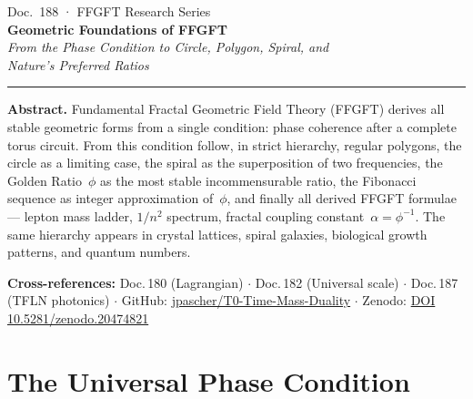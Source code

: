 
\thispagestyle{firstpage}
\begin{center}
  {\small\color{T0gray} Doc.~188 · FFGFT Research Series}\\[6pt]
  {\LARGE\bfseries\color{T0blue}
    Geometric Foundations of FFGFT}\\[6pt]
  {\large\itshape\color{T0gray}
    From the Phase Condition to Circle, Polygon, Spiral, and\\
    Nature's Preferred Ratios}\\[8pt]
  {\color{T0red}\rule{0.65\linewidth}{1.5pt}}
\end{center}
\vspace{4pt}

\begin{infobox}
\textbf{Abstract.}
Fundamental Fractal Geometric Field Theory (FFGFT) derives all
stable geometric forms from a single condition: phase coherence
after a complete torus circuit. From this condition follow, in
strict hierarchy, regular polygons, the circle as a limiting case,
the spiral as the superposition of two frequencies, the Golden
Ratio~$\phi$ as the most stable incommensurable ratio, the Fibonacci
sequence as integer approximation of~$\phi$, and finally all derived
FFGFT formulae — lepton mass ladder, $1/n^2$ spectrum, fractal
coupling constant~$\alpha = \phi^{-1}$. The same hierarchy appears
in crystal lattices, spiral galaxies, biological growth patterns,
and quantum numbers.

\smallskip\noindent\textbf{Cross-references:}
Doc.\,180 (Lagrangian) $\cdot$
Doc.\,182 (Universal scale) $\cdot$
Doc.\,187 (TFLN photonics) $\cdot$
GitHub: \href{https://github.com/jpascher/T0-Time-Mass-Duality}{jpascher/T0-Time-Mass-Duality} $\cdot$
Zenodo: \href{https://zenodo.org/records/20474821}{DOI 10.5281/zenodo.20474821}
\end{infobox}

\tableofcontents
\bigskip

\section{The Universal Phase Condition}

